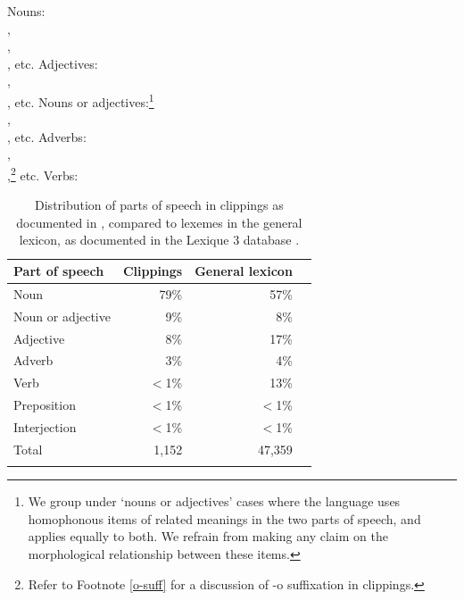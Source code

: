 \documentclass[output=paper,colorlinks,citecolor=brown]{langscibook}
\begin{document}
\begin{exe}
	\ex\label{ex:first}\begin{xlist}
		\ex Nouns: \\,\\ ,\\ , etc.
		\ex Adjectives:\\ ,\\ , etc.
		\ex Nouns or adjectives:\footnote{We group under ‘nouns or adjectives’ cases where the language uses homophonous items of related meanings in the two parts of speech, and  applies equally to both. We refrain from making any claim on the morphological relationship between these items.}\\
		,\\ , etc.
		\ex Adverbs:\\ ,\\ ,\footnote{Refer to Footnote \ref{o-suff} for a discussion of -o suffixation in  clippings.} etc.
		\ex Verbs: 
	\end{xlist}
\end{exe}


\begin{table}
	\centering
	\begin{tabular}{lrrl}
		\lsptoprule
		Part of speech  & Clippings\is{clipping}  & General lexicon\\%
		\midrule
		Noun &   79\% & 57\%\\%
		Noun or adjective &   9\% & 8\%\\%
		Adjective &   8\% & 17\%\\%
		Adverb &  3\% &  4\%\\%
		Verb &   $<$1\% & 13\%\\%
		Preposition & $<$1\% & $<$1\%\\%
		Interjection & $<$1\% & $<$1\%\\%
		\midrule
		Total &  1,152 & 47,359\\
		\lspbottomrule
	\end{tabular}
	\caption{Distribution of parts of speech in clippings as documented in \citet{antoine2000}, compared to lexemes in the general lexicon, as \mbox{documented} in the Lexique 3 database \citet{newbrysbaertveronispallier2007}. \label{tab:productivity}}
\end{table}
\end{document}
